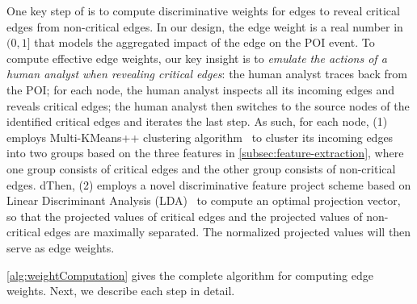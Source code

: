 One key step of \tool is to compute discriminative weights for edges to reveal critical edges from non-critical edges.
In our design, the edge weight is a real number in $(0, 1]$ that 
models the aggregated impact of the edge on the POI event.
%
To compute effective edge weights, our key insight is to \emph{emulate the actions of a human analyst when revealing critical edges}: the human analyst traces back from the POI; for each node, the human analyst inspects all its incoming edges and reveals critical edges; the human analyst then switches to the source nodes of the identified critical edges and iterates the last step.
%
As such, for each node, (1) \tool employs Multi-KMeans++ clustering algorithm~\cite{Arthur:2007:KAC:1283383.1283494} to cluster its incoming edges into two groups based on the three features in \cref{subsec:feature-extraction}, where one group consists of critical edges and the other group consists of non-critical edges. 
dThen, (2) \tool employs a novel discriminative feature project scheme based on Linear Discriminant Analysis (LDA)~\cite{Mika99fisherdiscriminant} to compute an optimal projection vector, so that the projected values of critical edges and the projected values of non-critical edges are maximally separated.
The normalized projected values will then serve as edge weights.

\cref{alg:weightComputation} gives the complete algorithm for computing edge weights. Next, we describe each step in detail.









